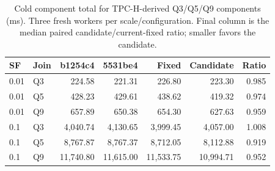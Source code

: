 \begin{table}[ht]
\caption{Cold component total for TPC-H-derived Q3/Q5/Q9 components (ms). Three fresh workers per scale/configuration. Final column is the median paired candidate/current-fixed ratio; smaller favors the candidate.}
\label{tab:tpch-total}
\centering\small
\begin{tabular}{@{}llrrrrr@{}}
\toprule
SF & Join & b1254c4 & 5531be4 & Fixed & Candidate & Ratio \\
\midrule
0.01 & Q3 & 224.58 & 221.31 & 226.80 & 223.30 & 0.985 \\
0.01 & Q5 & 428.23 & 429.61 & 438.62 & 419.32 & 0.974 \\
0.01 & Q9 & 657.89 & 650.38 & 654.30 & 627.63 & 0.959 \\
0.1 & Q3 & 4,040.74 & 4,130.65 & 3,999.45 & 4,057.00 & 1.008 \\
0.1 & Q5 & 8,767.87 & 8,767.37 & 8,712.05 & 8,112.88 & 0.919 \\
0.1 & Q9 & 11,740.80 & 11,615.00 & 11,533.75 & 10,994.71 & 0.952 \\
\bottomrule
\end{tabular}
\end{table}

